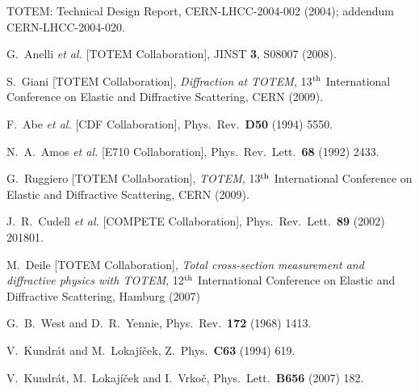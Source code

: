 \documentclass{desyproc}
\begin{document}
\begin{footnotesize}
\begin{thebibliography}{99}

	TOTEM: Technical Design Report, CERN-LHCC-2004-002 (2004); addendum CERN-LHCC-2004-020.

  G.~Anelli {\it et al.}  [TOTEM Collaboration],
  JINST {\bf 3}, S08007 (2008).

	S.~Giani [TOTEM Collaboration],
	{\it Diffraction at TOTEM},
	13$^{\rm th}$ International Conference on Elastic and Diffractive Scattering,
	CERN (2009).

  F.~Abe {\it et al.}  [CDF Collaboration],
  Phys.\ Rev.\  {\bf D50} (1994) 5550.

  N.~A.~Amos {\it et al.}  [E710 Collaboration],
  Phys.\ Rev.\ Lett.\  {\bf 68} (1992) 2433.

	G.~Ruggiero [TOTEM Collaboration],
	{\it TOTEM},
	13$^{\rm th}$ International Conference on Elastic and Diffractive Scattering,
	CERN (2009).

  J.~R.~Cudell {\it et al.}  [COMPETE Collaboration],
  Phys.\ Rev.\ Lett.\  {\bf 89} (2002) 201801.

	M.~Deile  [TOTEM Collaboration],
	{\it Total cross-section measurement and diffractive physics with TOTEM},
	12$^{\rm th}$ International Conference on Elastic and Diffractive Scattering,
	Hamburg (2007)

  G.~B.~West and D.~R.~Yennie,
  Phys.\ Rev.\  {\bf 172} (1968) 1413.

  V.~Kundr\' at and M.~Lokaj\' i\v cek,
  Z.\ Phys.\ {\bf C63} (1994) 619.

  V.~Kundr\' at, M.~Lokaj\' i\v cek and I.~Vrko\v c,
  Phys.\ Lett.\ {\bf B656} (2007) 182.


\end{thebibliography}
\end{footnotesize}
\end{document}
